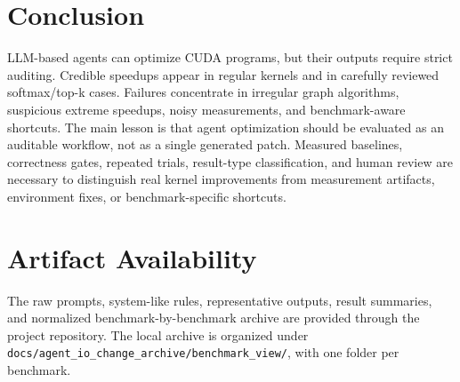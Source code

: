 \documentclass[conference]{IEEEtran}
\newcommand{\mainbodyendpage}{?}
\begin{document}
\section{Conclusion}
\label{sec:conclusion}

LLM-based agents can optimize CUDA programs, but their outputs require strict auditing. Credible speedups appear in regular kernels and in carefully reviewed softmax/top-k cases. Failures concentrate in irregular graph algorithms, suspicious extreme speedups, noisy measurements, and benchmark-aware shortcuts. The main lesson is that agent optimization should be evaluated as an auditable workflow, not as a single generated patch. Measured baselines, correctness gates, repeated trials, result-type classification, and human review are necessary to distinguish real kernel improvements from measurement artifacts, environment fixes, or benchmark-specific shortcuts.

\section*{Artifact Availability}
The raw prompts, system-like rules, representative outputs, result summaries, and normalized benchmark-by-benchmark archive are provided through the project repository. The local archive is organized under \texttt{docs/agent\_io\_change\_archive/benchmark\_view/}, with one folder per benchmark.



\xdef\mainbodyendpage{\thepage}
\end{document}
